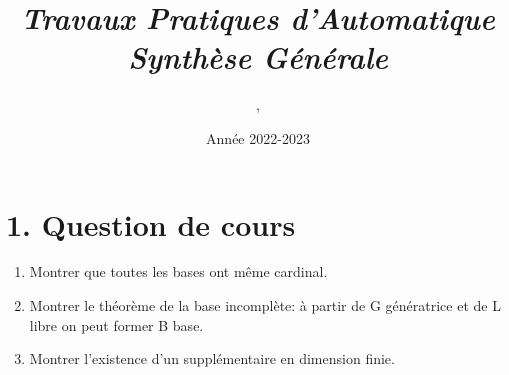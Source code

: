 \documentclass[11pt]{article}
\title{\bf \itshape Travaux Pratiques d'Automatique \\ Synthèse Générale}
\author{\Name, \texttt{\Login}}
\date{Année 2022-2023}
\newenvironment{qparts}{\begin{enumerate}[{(}a{)}]}{\end{enumerate}}
\begin{document}
\maketitle


\section*{1. Question de cours}
\begin{qparts}
\item Montrer que toutes les bases ont même cardinal.

\item Montrer le théorème de la base incomplète: à partir de G génératrice et de L libre on peut former B base.

\item Montrer l'existence d'un supplémentaire en dimension finie.

\end{qparts}
\end{document}
